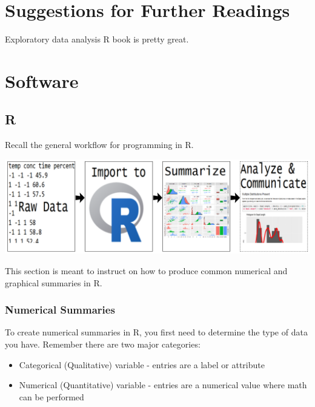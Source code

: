 \documentclass[
]{book}
\providecommand{\tightlist}{%
  \setlength{\itemsep}{0pt}\setlength{\parskip}{0pt}}
\theoremstyle{definition}
\theoremstyle{definition}
\theoremstyle{definition}
\theoremstyle{remark}
\begin{document}
\hypertarget{suggestions-for-further-readings}{%
\section{Suggestions for Further Readings}\label{suggestions-for-further-readings}}

Exploratory data analysis R book is pretty great.

\hypertarget{software-2}{%
\section{Software}\label{software-2}}

\hypertarget{r-2}{%
\subsection{R}\label{r-2}}

Recall the general workflow for programming in R.

\begin{center}\includegraphics[width=0.8\linewidth]{img/RWorkFlow} \end{center}

This section is meant to instruct on how to produce common numerical and graphical summaries in R.

\hypertarget{numerical-summaries}{%
\subsubsection{Numerical Summaries}\label{numerical-summaries}}

To create numerical summaries in R, you first need to determine the type of data you have. Remember there are two major categories:

\begin{itemize}
\tightlist
\item
  Categorical (Qualitative) variable - entries are a label or attribute\\
\item
  Numerical (Quantitative) variable - entries are a numerical value where math can be performed
\end{itemize}
\end{document}
